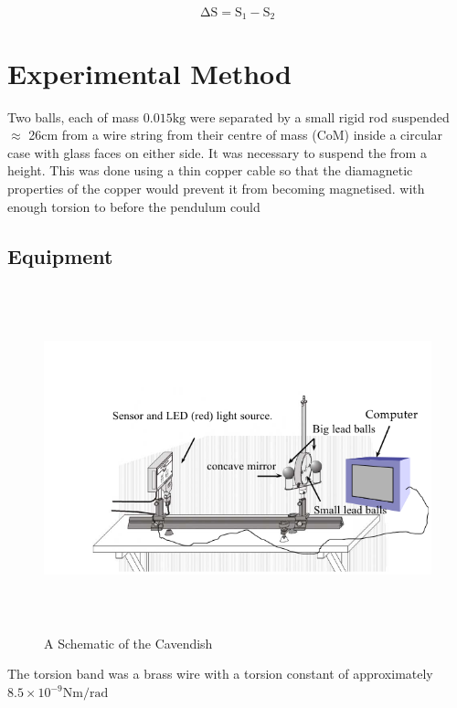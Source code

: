 \documentclass[12pt]{article}
\begin{document}
\begin{equation}
\label{eq:deltaS}
\mathrm{\Delta S = S_{1}-S_{2}}
\end{equation}


\section{Experimental Method}

Two balls, each of mass $0.015\mathrm{kg}$ were separated by a small rigid rod suspended $\approx$ 26cm from a wire string from their centre of mass (CoM) inside a circular case with glass faces on either side. It was necessary to suspend the from a height. This was done using a thin copper cable so that the diamagnetic properties of the copper would prevent it from becoming magnetised. with enough torsion to before the pendulum could 

\subsection{Equipment}


%
%

\begin{figure}[H]
\centering
\includegraphics[width=15cm, height=10cm]{images/schematic.png}
\caption{A Schematic of the Cavendish}
\label{fig:probe}
\end{figure}

The torsion band was a brass wire with a torsion constant of approximately $ 8.5 \times{10^{-9}}\mathrm{Nm/rad }$
\end{document}
